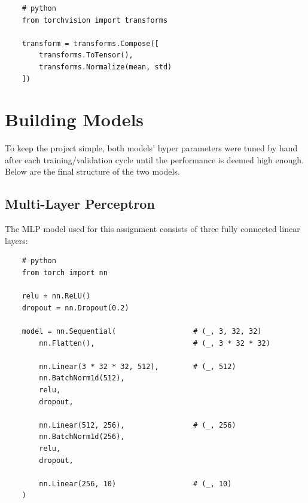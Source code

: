 \documentclass{report}
\begin{document}
\newpage
\begin{verbatim}
    # python
    from torchvision import transforms

    transform = transforms.Compose([
        transforms.ToTensor(),
        transforms.Normalize(mean, std)
    ])
\end{verbatim}

\section{Building Models}
To keep the project simple, both models' hyper parameters were tuned by hand after each training/validation 
cycle until the performance is deemed high enough. Below are the final structure of the two models.

\subsection{Multi-Layer Perceptron}
The MLP model used for this assignment consists of three fully connected linear layers:

\begin{verbatim}
    # python
    from torch import nn

    relu = nn.ReLU()
    dropout = nn.Dropout(0.2)
    
    model = nn.Sequential(                  # (_, 3, 32, 32)
        nn.Flatten(),                       # (_, 3 * 32 * 32)

        nn.Linear(3 * 32 * 32, 512),        # (_, 512)
        nn.BatchNorm1d(512),
        relu,
        dropout,

        nn.Linear(512, 256),                # (_, 256)
        nn.BatchNorm1d(256),
        relu,
        dropout,

        nn.Linear(256, 10)                  # (_, 10)
    )
\end{verbatim}
\end{document}
